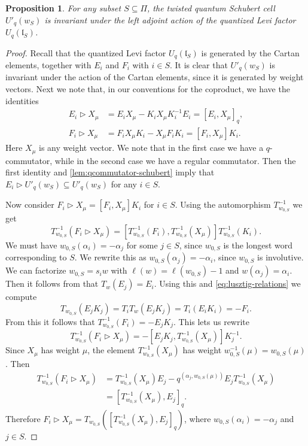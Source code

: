 \documentclass[a4paper, 12pt, reqno, english]{amsart}
\numberwithin{equation}{section}
\numberwithin{figure}{section}
\theoremstyle{plain}
\theoremstyle{plain}
\theoremstyle{plain}
\newtheorem{proposition}[theorem]{Proposition}
\theoremstyle{plain}
\theoremstyle{plain}
\theoremstyle{definition}
\theoremstyle{definition}
\theoremstyle{definition}
\theoremstyle{remark}
\theoremstyle{definition}
\theoremstyle{definition}
\newcommand{\UqlS}{U_q(\mathfrak{l}_S)}
\newcommand{\tschub}{U'_q}
\newcommand{\simpleroots}{\Pi}
\begin{document}
\begin{proposition}
\label{prop:adjoint-action-schubert}
For any subset $S \subseteq \simpleroots$, the twisted quantum Schubert cell $\tschub(w_S)$ is invariant under the left adjoint action of the quantized Levi factor $\UqlS$.
\end{proposition}

\begin{proof}
Recall that the quantized Levi factor $\UqlS$ is generated by the Cartan elements, together with $E_i$ and $F_i$ with $i \in S$.
It is clear that $\tschub(w_S)$ is invariant under the action of the Cartan elements, since it is generated by weight vectors.
Next we note that, in our conventions for the coproduct, we have the identities
\[
\begin{split}
E_i \triangleright X_\mu & = E_i X_\mu - K_i X_\mu K_i^{-1} E_i = [E_i, X_\mu]_q, \\
F_i \triangleright X_\mu & = F_i X_\mu K_i - X_\mu F_i K_i = [F_i, X_\mu] K_i.
\end{split}
\]
Here $X_\mu$ is any weight vector.
We note that in the first case we have a $q$-commutator, while in the second case we have a regular commutator.
Then the first identity and \cref{lem:qcommutator-schubert} imply that $E_i \triangleright \tschub(w_S) \subseteq \tschub(w_S)$ for any $i \in S$.

Now consider $F_i \triangleright X_\mu = [F_i, X_\mu] K_i$ for $i \in S$.
Using the automorphism $T_{w_{0, S}}^{-1}$ we get
\[
T_{w_{0, S}}^{-1}(F_i \triangleright X_\mu) = [T_{w_{0, S}}^{-1}(F_i), T_{w_{0, S}}^{-1}(X_\mu)] T_{w_{0, S}}^{-1}(K_i).
\]
We must have $w_{0, S}(\alpha_i) = - \alpha_j$ for some $j \in S$, since $w_{0, S}$ is the longest word corresponding to $S$.
We rewrite this as $w_{0, S}(\alpha_j) = - \alpha_i$, since $w_{0, S}$ is involutive.
We can factorize $w_{0, S} = s_i w$ with $\ell(w) = \ell(w_{0, S}) - 1$ and $w(\alpha_j) = \alpha_i$.
Then it follows from \cite[Proposition 8.20]{jantzen} that $T_w(E_j) = E_i$.
Using this and \eqref{eq:lusztig-relations} we compute
\[
T_{w_{0, S}} (E_j K_j) = T_i T_w (E_j K_j) = T_i (E_i K_i) = - F_i.
\]
From this it follows that $T_{w_{0, S}}^{-1}(F_i) = - E_j K_j$.
This lets us rewrite
\[
T_{w_{0, S}}^{-1}(F_i \triangleright X_\mu) = - [E_j K_j, T_{w_{0, S}}^{-1}(X_\mu)] K_j^{-1}.
\]
Since $X_\mu$ has weight $\mu$, the element $T_{w_{0, S}}^{-1}(X_\mu)$ has weight $w_{0, S}^{-1}(\mu) = w_{0, S}(\mu)$. Then
\[
\begin{split}
T_{w_{0, S}}^{-1}(F_i \triangleright X_\mu)
& = T_{w_{0, S}}^{-1}(X_\mu) E_j - q^{(\alpha_j, w_{0, S}(\mu))} E_j T_{w_{0, S}}^{-1}(X_\mu) \\
& = [T_{w_{0, S}}^{-1}(X_\mu), E_j]_q.
\end{split}
\]
Therefore $F_i \triangleright X_\mu = T_{w_{0, S}} \left( [T_{w_{0, S}}^{-1}(X_\mu), E_j]_q \right)$, where $w_{0, S}(\alpha_i) = - \alpha_j$ and $j \in S$.


\end{proof}
\end{document}
